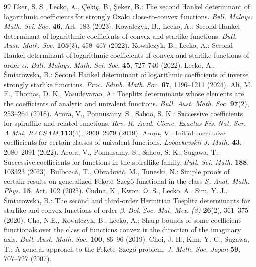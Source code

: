 \documentclass[10pt,a4paper]{amsart}
\numberwithin{equation}{section}
\begin{document}
\begin{thebibliography}{99}
 Eker, S. S., Lecko, A., \c{C}eki\c{c}, B., \c{S}eker, B.: The second Hankel determinant of logarithmic coefficients for strongly Ozaki close-to-convex functions. \textit{Bull. Malays. Math. Sci. Soc.} \textbf{46}, Art. 183 (2023).
 Kowalczyk, B., Lecko, A.: Second Hankel determinant of logarithmic coefficients of convex and starlike functions. \textit{Bull. Aust. Math. Soc.} \textbf{105}(3), 458--467 (2022).
 Kowalczyk, B., Lecko, A.: Second Hankel determinant of logarithmic coefficients of convex and starlike functions of order $\alpha$. \textit{Bull. Malays. Math. Sci. Soc.} \textbf{45}, 727--740 (2022).
 Lecko, A., \'{S}miarowska, B.: Second Hankel determinant of logarithmic coefficients of inverse strongly starlike functions. \textit{Proc. Edinb. Math. Soc.} \textbf{67}, 1196--1211 (2024).
 Ali, M. F., Thomas, D. K., Vasudevarao, A.: Toeplitz determinants whose elements are the coefficients of analytic and univalent functions. \textit{Bull. Aust. Math. Soc.} \textbf{97}(2), 253--264 (2018).
 Arora, V., Ponnusamy, S., Sahoo, S. K.: Successive coefficients for spirallike and related functions. \textit{Rev. R. Acad. Cienc. Exactas F\'is. Nat. Ser. A Mat. RACSAM} \textbf{113}(4), 2969--2979 (2019).
 Arora, V.: Initial successive coefficients for certain classes of univalent functions. \textit{Lobachevskii J. Math.} \textbf{43}, 2080--2091 (2022).
 Arora, V., Ponnusamy, S., Sahoo, S. K., Sugawa, T.: Successive coefficients for functions in the spirallike family. \textit{Bull. Sci. Math.} \textbf{188}, 103323 (2023).
 Bulboac\u{a}, T., Obradovi\'c, M., Tuneski, N.: Simple proofs of certain results on generalized Fekete--Szeg\H{o} functional in the class $\mathcal{S}$. \textit{Anal. Math. Phys.} \textbf{15}, Art. 102 (2025).
 Cudna, K., Kwon, O. S., Lecko, A., Sim, Y. J., \'{S}miarowska, B.: The second and third-order Hermitian Toeplitz determinants for starlike and convex functions of order $\beta$. \textit{Bol. Soc. Mat. Mex. (3)} \textbf{26}(2), 361--375 (2020).
 Cho, N.E., Kowalczyk, B., Lecko, A.: Sharp bounds of some coefficient functionals over the class of functions convex in the direction of the imaginary axis. \textit{Bull. Aust. Math. Soc.} \textbf{100}, 86--96 (2019).
 Choi, J. H., Kim, Y. C., Sugawa, T.: A general approach to the Fekete--Szeg\H{o} problem. \textit{J. Math. Soc. Japan} \textbf{59}, 707--727 (2007).

\end{thebibliography}
\end{document}
